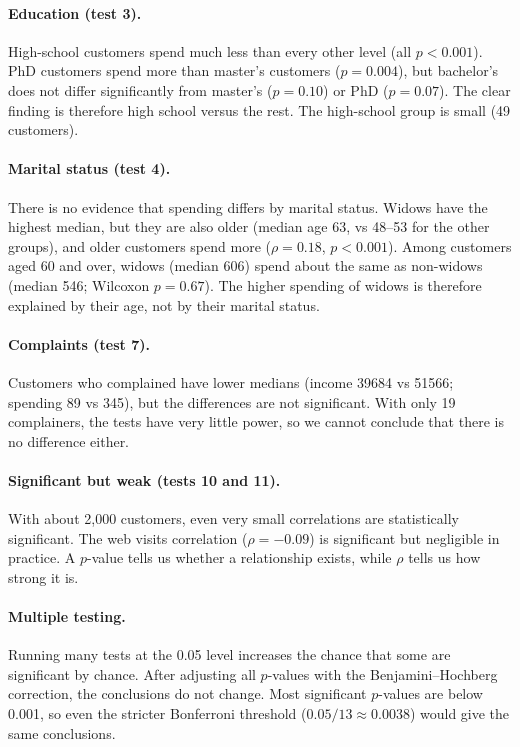 \documentclass[11pt,a4paper]{article}
\begin{document}
\paragraph{Education (test 3).} High-school customers spend much less than every other level (all $p < 0.001$). PhD customers spend more than master's customers ($p = 0.004$), but bachelor's does not differ significantly from master's ($p = 0.10$) or PhD ($p = 0.07$). The clear finding is therefore high school versus the rest. The high-school group is small (49 customers).

\paragraph{Marital status (test 4).} There is no evidence that spending differs by marital status. Widows have the highest median, but they are also older (median age 63, vs 48--53 for the other groups), and older customers spend more ($\rho = 0.18$, $p < 0.001$). Among customers aged 60 and over, widows (median 606) spend about the same as non-widows (median 546; Wilcoxon $p = 0.67$). The higher spending of widows is therefore explained by their age, not by their marital status.

\paragraph{Complaints (test 7).} Customers who complained have lower medians (income \num{39684} vs \num{51566}; spending 89 vs 345), but the differences are not significant. With only 19 complainers, the tests have very little power, so we cannot conclude that there is no difference either.

\paragraph{Significant but weak (tests 10 and 11).} With about 2,000 customers, even very small correlations are statistically significant. The web visits correlation ($\rho = -0.09$) is significant but negligible in practice. A $p$-value tells us whether a relationship exists, while $\rho$ tells us how strong it is.

\paragraph{Multiple testing.} Running many tests at the 0.05 level increases the chance that some are significant by chance. After adjusting all $p$-values with the Benjamini--Hochberg correction, the conclusions do not change. Most significant $p$-values are below 0.001, so even the stricter Bonferroni threshold ($0.05/13 \approx 0.0038$) would give the same conclusions.
\end{document}
